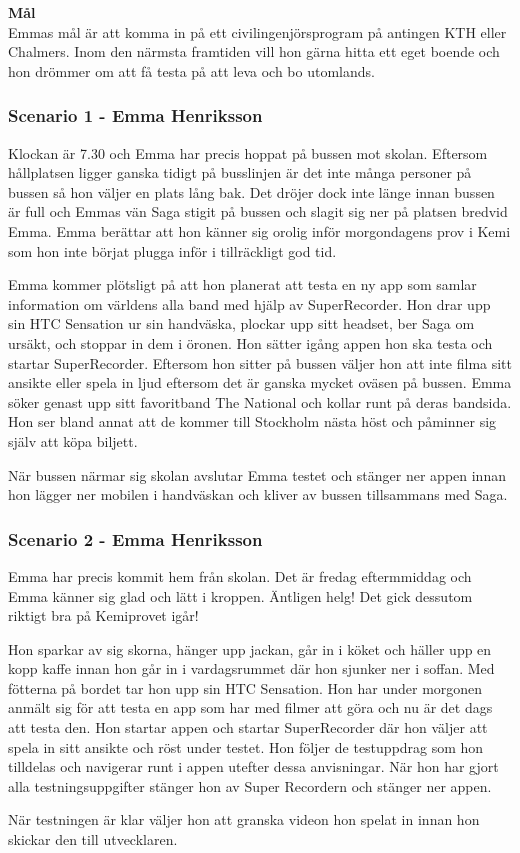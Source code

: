 \textbf{Mål}\\
Emmas mål är att komma in på ett civilingenjörsprogram på antingen KTH eller Chalmers. Inom den närmsta framtiden vill hon gärna hitta ett eget boende och hon drömmer om att få testa på att leva och bo utomlands.

\newpage

\subsubsection{Scenario 1 - Emma Henriksson}
Klockan är 7.30 och Emma har precis hoppat på bussen mot skolan. Eftersom hållplatsen ligger ganska tidigt på busslinjen är det inte många personer på bussen så hon väljer en plats lång bak. Det dröjer dock inte länge innan bussen är full och Emmas vän Saga stigit på bussen och slagit sig ner på platsen bredvid Emma. Emma berättar att hon känner sig orolig inför morgondagens prov i Kemi som hon inte börjat plugga inför i tillräckligt god tid.

Emma kommer plötsligt på att hon planerat att testa en ny app som samlar information om världens alla band med hjälp av SuperRecorder. Hon drar upp sin HTC Sensation ur sin handväska, plockar upp sitt headset, ber Saga om ursäkt, och stoppar in dem i öronen. Hon sätter igång appen hon ska testa och startar SuperRecorder. Eftersom hon sitter på bussen väljer hon att inte filma sitt ansikte eller spela in ljud eftersom det är ganska mycket oväsen på bussen. Emma söker genast upp sitt favoritband The National och kollar runt på deras bandsida. Hon ser bland annat att de kommer till Stockholm nästa höst och påminner sig själv att köpa biljett.

När bussen närmar sig skolan avslutar Emma testet och stänger ner appen innan hon lägger ner mobilen i handväskan och kliver av bussen tillsammans med Saga.

\subsubsection{Scenario 2 - Emma Henriksson}
Emma har precis kommit hem från skolan. Det är fredag eftermmiddag och Emma känner sig glad och lätt i kroppen. Äntligen helg! Det gick dessutom riktigt bra på Kemiprovet igår!

Hon sparkar av sig skorna, hänger upp jackan, går in i köket och häller upp en kopp kaffe innan hon går in i vardagsrummet där hon sjunker ner i soffan. Med fötterna på bordet tar hon upp sin HTC Sensation. Hon har under morgonen anmält sig för att testa en app som har med filmer att göra och nu är det dags att testa den. Hon startar appen och startar SuperRecorder där hon väljer att spela in sitt ansikte och röst under testet. Hon följer de testuppdrag som hon tilldelas och navigerar runt i appen utefter dessa anvisningar. När hon har gjort alla testningsuppgifter stänger hon av Super Recordern och stänger ner appen.

När testningen är klar väljer hon att granska videon hon spelat in innan hon skickar den till utvecklaren.
